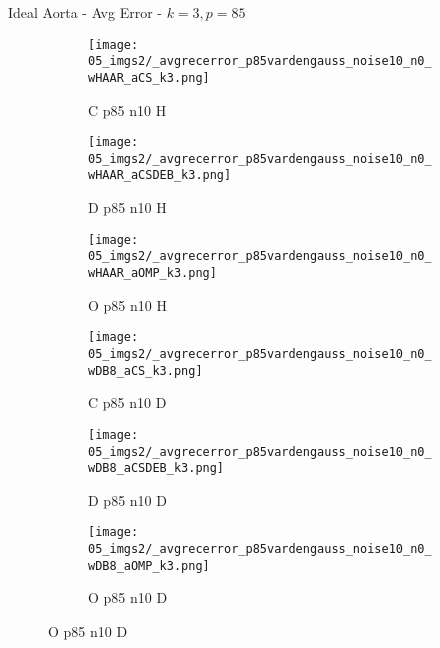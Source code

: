 \begin{frame}{Ideal Aorta - Avg Error - $k=3,p=85$}{}
\begin{figure}
\begin{subfigure}{0.13\textwidth}
\texttt{[image: 05\_imgs2/\_avgrecerror\_p85vardengauss\_noise10\_n0\_wHAAR\_aCS\_k3.png]}
\caption*{\tiny C p85 n10 H}
\end{subfigure}
\begin{subfigure}{0.13\textwidth}
\texttt{[image: 05\_imgs2/\_avgrecerror\_p85vardengauss\_noise10\_n0\_wHAAR\_aCSDEB\_k3.png]}
\caption*{\tiny D p85 n10 H}
\end{subfigure}
\begin{subfigure}{0.13\textwidth}
\texttt{[image: 05\_imgs2/\_avgrecerror\_p85vardengauss\_noise10\_n0\_wHAAR\_aOMP\_k3.png]}
\caption*{\tiny O p85 n10 H}
\end{subfigure}
\begin{subfigure}{0.13\textwidth}
\texttt{[image: 05\_imgs2/\_avgrecerror\_p85vardengauss\_noise10\_n0\_wDB8\_aCS\_k3.png]}
\caption*{\tiny C p85 n10 D}
\end{subfigure}
\begin{subfigure}{0.13\textwidth}
\texttt{[image: 05\_imgs2/\_avgrecerror\_p85vardengauss\_noise10\_n0\_wDB8\_aCSDEB\_k3.png]}
\caption*{\tiny D p85 n10 D}
\end{subfigure}
\begin{subfigure}{0.13\textwidth}
\texttt{[image: 05\_imgs2/\_avgrecerror\_p85vardengauss\_noise10\_n0\_wDB8\_aOMP\_k3.png]}
\caption*{\tiny O p85 n10 D}
\end{subfigure}

\vspace{5pt}


\end{figure}
\end{frame}
